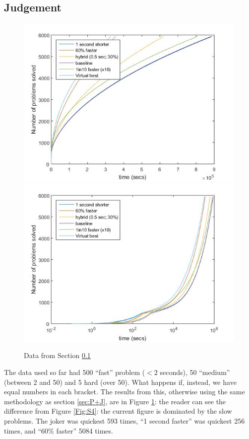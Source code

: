 \documentclass{article}
\begin{document}
\subsection{Judgement}\label{sec:J}
\begin{figure}[h]
\caption{Data from Section \ref{sec:J}\label{Fig:S5}}
\includegraphics[scale=0.60]{Fig5a.jpg}
\includegraphics[scale=0.60]{Fig5b.jpg}
\end{figure}
The data used so far had 500 ``fast'' problem ($<2$ seconds), 50 ``medium''  (between 2 and 50) and 5 hard (over 50). What happens if, instead, we have equal numbers in each bracket. The results from this, otherwise using the same methodology as section \ref{sec:P+J}, are in Figure \ref{Fig:S5}: the reader can see the difference from Figure \ref{Fig:S4}: the current figure is dominated by the slow problems. The joker was quickest 593 times, ``1 second faster'' was quickest 256 times, and ``60\% faster'' 5084 times.
\end{document}
